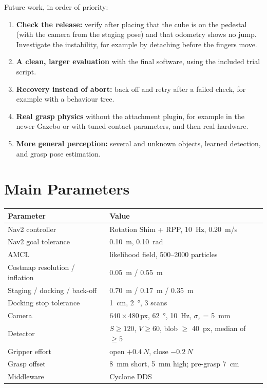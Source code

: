 \documentclass[journal]{IEEEtran}
\begin{document}
Future work, in order of priority:
\begin{enumerate}
  \item \textbf{Check the release:} verify after placing that the cube is on the pedestal (with the camera from the staging pose) and that odometry shows no jump. Investigate the instability, for example by detaching before the fingers move.
  \item \textbf{A clean, larger evaluation} with the final software, using the included trial script.
  \item \textbf{Recovery instead of abort:} back off and retry after a failed check, for example with a behaviour tree.
  \item \textbf{Real grasp physics} without the attachment plugin, for example in the newer Gazebo or with tuned contact parameters, and then real hardware.
  \item \textbf{More general perception:} several and unknown objects, learned detection, and grasp pose estimation.
\end{enumerate}

\appendices
\section{Main Parameters}
\begin{table}[h]
\centering
\footnotesize
\setlength{\tabcolsep}{4pt}\begin{tabular}{@{}lL{0.52\columnwidth}@{}}
\toprule
Parameter & Value \\
\midrule
Nav2 controller & Rotation Shim + RPP, \SI{10}{Hz}, \SI{0.20}{m/s} \\
Nav2 goal tolerance & \SI{0.10}{m}, \SI{0.10}{rad} \\
AMCL & likelihood field, 500--2000 particles \\
Costmap resolution / inflation & \SI{0.05}{m} / \SI{0.55}{m} \\
Staging / docking / back-off & \SI{0.70}{m} / \SI{0.17}{m} / \SI{0.35}{m} \\
Docking stop tolerance & \SI{1}{cm}, \SI{2}{\degree}, 3 scans \\
Camera & 640\,$\times$\,480\,px, \SI{62}{\degree}, \SI{10}{Hz}, $\sigma_z$ = \SI{5}{mm} \\
Detector & $S \geq 120$, $V \geq 60$, blob $\geq$ \SI{40}{px}, median of $\geq 5$ \\
Gripper effort & open $+\SI{0.4}{N}$, close $-\SI{0.2}{N}$ \\
Grasp offset & \SI{8}{mm} short, \SI{5}{mm} high; pre-grasp \SI{7}{cm} \\
Middleware & Cyclone DDS \\
\bottomrule
\end{tabular}
\end{table}
\end{document}
